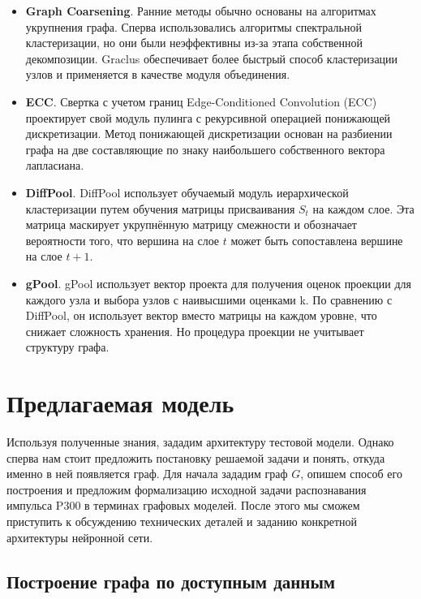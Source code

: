 \documentclass[12pt]{article}
\begin{document}
\begin{itemize}
    \item \textbf{Graph Coarsening}. Ранние методы обычно основаны на алгоритмах укрупнения графа. Сперва использовались алгоритмы спектральной кластеризации, но они были неэффективны из-за этапа собственной декомпозиции. Graclus \cite{dhillon2007weighted} обеспечивает более быстрый способ кластеризации узлов и применяется в качестве модуля объединения. 

    \item \textbf{ECC}. Свертка с учетом границ Edge-Conditioned Convolution (ECC) \cite{simonovsky2017dynamic} проектирует свой модуль пулинга с рекурсивной операцией понижающей дискретизации. Метод понижающей дискретизации основан на разбиении графа на две составляющие по знаку наибольшего собственного вектора лапласиана. 
    
    \item \textbf{DiffPool}. DiffPool \cite{ying2018hierarchical} использует обучаемый модуль иерархической кластеризации путем обучения матрицы присваивания $S_t$ на каждом слое. Эта матрица маскирует укрупнённую матрицу смежности и обозначает вероятности того, что вершина на слое $t$ может быть сопоставлена вершине на слое $t + 1$.
    
    \item \textbf{gPool}. gPool \cite{gao2019graph} использует вектор проекта для получения оценок проекции для каждого узла и выбора узлов с наивысшими оценками k. По сравнению с DiffPool, он использует вектор вместо матрицы на каждом уровне, что снижает сложность хранения. Но процедура проекции не учитывает структуру графа. 
\end{itemize}

\section{Предлагаемая модель}

Используя полученные знания, зададим архитектуру тестовой модели. Однако сперва нам стоит предложить постановку решаемой задачи и понять, откуда именно в ней появляется граф. Для начала зададим граф $G$, опишем способ его построения и предложим формализацию исходной задачи распознавания импульса P300 в терминах графовых моделей. После этого мы сможем приступить к обсуждению технических деталей и заданию конкретной архитектуры нейронной сети.

\subsection{Построение графа по доступным данным}
\end{document}

